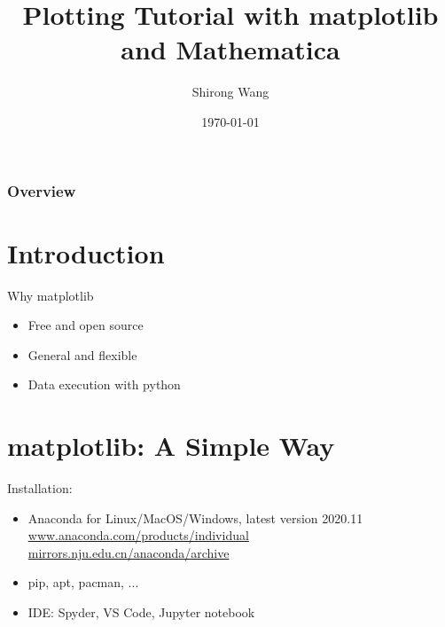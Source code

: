 \documentclass[aspectratio=1610]{beamer}
\title[]{%
\textbf{Plotting Tutorial with matplotlib and Mathematica}
\vspace{15pt}} %
\author{Shirong Wang} %
\institute[] %
{Department of Chemistry,
Fudan University \\ %
}
\date{\today} %
\numberwithin{equation}{section}
\begin{document}
\begin{frame}
\titlepage %
\end{frame}

\begin{frame}
\frametitle{Overview} %
\tableofcontents %
\end{frame}

\section{Introduction}
\begin{frame}{Why matplotlib}
	\begin{itemize}
		\item Free and open source
		\item General and flexible
		\item Data execution with python
	\end{itemize}
	
\end{frame}

\section{matplotlib: A Simple Way}
\begin{frame}
Installation:
\begin{itemize}
	\item Anaconda for Linux/MacOS/Windows, latest version 2020.11\\
	\href{https://www.anaconda.com/products/individual}{www.anaconda.com/products/individual}\\
	\href{http://mirrors.nju.edu.cn/anaconda/archive}{mirrors.nju.edu.cn/anaconda/archive}
	   \item pip, apt, pacman, ...
	\item IDE: Spyder, VS Code, Jupyter notebook
\end{itemize}

\end{frame}
\end{document}
